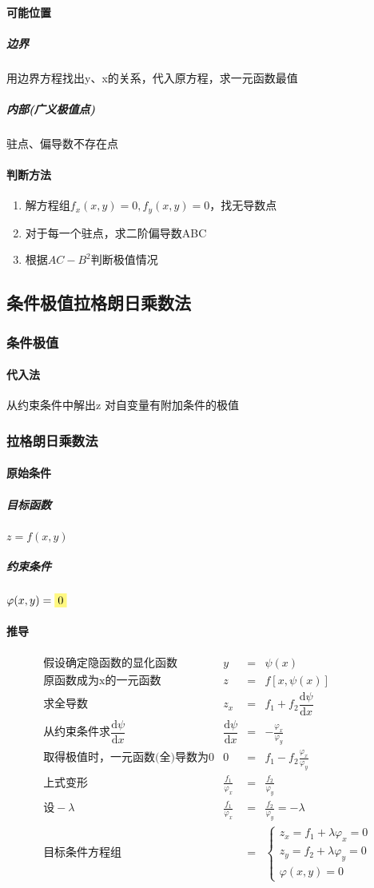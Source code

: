 \documentclass[UTF8,a4paper,12pt,scheme=chinese]{ctexbook}
\newcommand{\ud}{\mathrm{d}}
\newcommand{\hla}[1]{%
	\colorbox{yellow!50}{$\displaystyle#1$}}
\theoremstyle{plain}
\begin{document}
	\paragraph{可能位置}
	\subparagraph{边界}用边界方程找出y、x的关系，代入原方程，求一元函数最值
	\subparagraph{内部(广义极值点)}
	驻点、偏导数不存在点
	\paragraph{判断方法}
	\begin{enumerate}
		\item 解方程组$ f_{x}(x,y)=0,f_{y}(x,y)=0 $，找无导数点
		\item 对于每一个驻点，求二阶偏导数ABC
		\item 根据$ AC-B^{2} $判断极值情况
	\end{enumerate}
	\subsection{条件极值\quad 拉格朗日乘数法}
	\subsubsection{条件极值}
	\paragraph{代入法}从约束条件中解出z
	对自变量有附加条件的极值
	\subsubsection{拉格朗日乘数法}
	\paragraph{原始条件}
	\subparagraph{目标函数}$ z=f(x,y) $
	\subparagraph{约束条件}$ \varphi(x,y)=\hla{0} $
	\paragraph{推导}
	\[ \begin{array}{rrcl}
	\mbox{假设确定隐函数的显化函数}&y&=&\psi(x)\\
	\mbox{原函数成为x的一元函数}&z&=&f[x,\psi(x)]\\
	\mbox{求全导数}&z_x&=&f_1+f_2\dfrac{\ud \psi}{\ud x}\\
	\mbox{从约束条件求}\dfrac{\ud \psi}{\ud x}&\dfrac{\ud \psi}{\ud x}&=&-\frac{\varphi_{x}}{\varphi_{y}}\\
	\mbox{取得极值时，一元函数(全)导数为0}&0&=&f_1-f_2\frac{\varphi_{x}}{\varphi_{y}}\\
	\mbox{上式变形}&\frac{f_1}{\varphi_x}&=&\frac{f_2}{\varphi_y}\\
	\mbox{设}-\lambda&\frac{f_1}{\varphi_x}&=&\frac{f_2}{\varphi_y}=-\lambda\\
	\mbox{目标条件方程组}&&=&\left\lbrace \begin{array}{l}
	z_x=f_1+\lambda \varphi_x=0\\
	z_y=f_2+\lambda \varphi_y=0\\
	\varphi(x,y)=0
	\end{array}\right. 
	\end{array} \]
\end{document}
